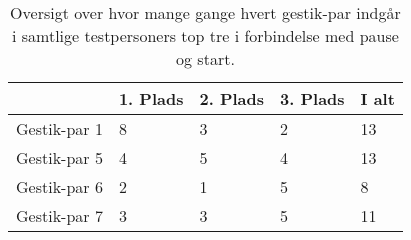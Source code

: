 %
\begin{table}[H]
	\centering
	\begin{tabular}{ | p{2.4cm} | p{2.4cm} | p{2.4cm} | p{2.4cm} |p{2.4cm}|}
	\hline
		 & 1. Plads & 2. Plads & 3. Plads & I alt \\ \hline
		Gestik-par 1 & 8 & 3 & 2 & 13\\ \hline
		Gestik-par 5 & 4 & 5 & 4 & 13\\ \hline
		Gestik-par 6 & 2 & 1 & 5 & 8\\ \hline 
		Gestik-par 7 & 3 & 3 & 5 & 11\\ \hline
	\end{tabular}
	\caption{Oversigt over hvor mange gange hvert gestik-par indgår i samtlige testpersoners top tre i forbindelse med pause og start.}
	\label{tab:GestikParITopTrePauseOversigt}
\end{table}
\noindent
%